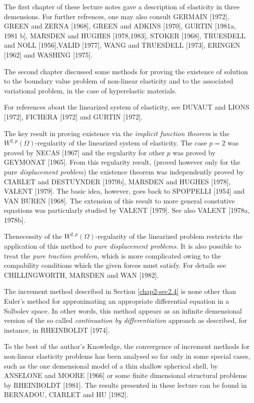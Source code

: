 The first chapter of these lecture notes gave a description of
elasticity in three demensions. For further refrences, one may also
consult GERMAIN [1972], GREEN and ZERNA [1968], GREEN and ADKINS
[1970], GURTIN [1981a, 1981 b], MARSDEN and HUGHES [1978,1983],
STOKER [1968], TRUESDELL and NOLL [1956],\break VALID [1977], WANG and
TRUESDELL [1973], ERINGEN [1962] and WASHING [1975].  

The second chapter discussed some methods for proving the existence of
solution to the boundary value problem of non-linear elasticity and to
the associated variational problem, in the case of hyperelastic
materials.  

For references about the linearized system of elasticity, see DUVAUT
and LIONS [1972], FICHERA [1972] and GURTIN [1972].  

The key result in proving existence via the \textit{implicit function
  theorem} is the $W^{2,p}(\Omega)$-regularity of the linearized
system of elasticity. The case $p=2$ was proved by NECAS [1967] and
the regularity for other $p$ was proved by GEYMONAT [1965]. From
this regularity result, (proved however only for the pure
\textit{displacement problem}) the existence theorem was independently
proved by CIARLET and DESTUYNDER [1979b], MARSDEN and HUGHES
[1978], VALENT [1979]. The basic idea, however, goes back to
SPOPPELLI [1954] and VAN BUREN [1968]. The extension of this result
to more general constutive equations was particularly studied by
VALENT [1979]. See also VALENT [1978a, 1978b].  

The\pageoriginale necessity of the $W^{2,p}(\Omega)$-regularity of the
linearized 
problem restricts the application of this method to \textit{pure
  displacement problems.} It is also possible to treat the \textit{pure
  traction problem,} which is more complicated owing to the
compability conditions which the given forces must satisfy. For
details see CHILLINGWORTH, MARSDEN and WAN [1982].  

The increment method described in Section \ref{chap2-sec2.4} is none
other than Euler's method for approximating an appropriate
differential equation in a Solbolev space. In other words, this method
appears as an 
infinite demensional version of the so called \textit{continuation by
  differentiation} approach as described, for instance, in RHEINBOLDT
[1974].  

To the best of the author's Knowledge, the convergence of increment
methods for non-linear elasticity problems has been analysed so far
only in some special cases, such as the one demensional model of a
thin shallow spherical shell, by ANSELONE and MOORE [1966] or some
finite dimensional structural problems by RHEINBOLDT [1981]. The
results presented in these lecture can be found in BERNADOU, CIARLET
and HU [1982].  

